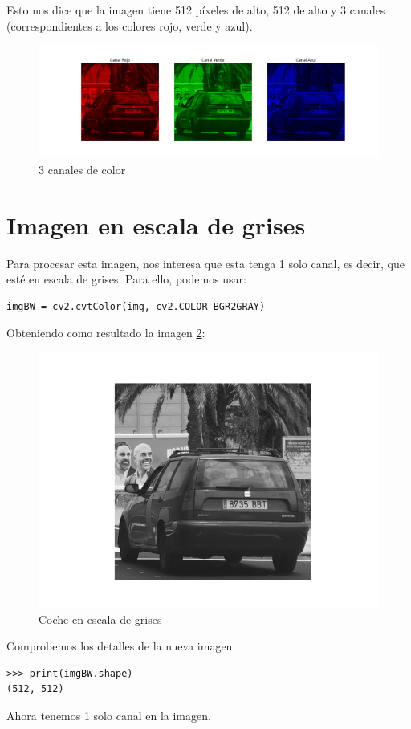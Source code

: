 Esto nos dice que la imagen tiene 512 píxeles de alto, 512 de alto y 3 canales (correspondientes a los colores rojo, verde y azul). 
\begin{figure}[H]
    \centering
    \includegraphics[width=1\linewidth]{Images/coche1Canales.png}
    \caption{3 canales de color}
    \label{coche1Canales}
\end{figure}

\section{Imagen en escala de grises}
Para procesar esta imagen, nos interesa que esta tenga 1 solo canal, es decir, que esté en escala de grises. Para ello, podemos usar:
\begin{verbatim}
imgBW = cv2.cvtColor(img, cv2.COLOR_BGR2GRAY)
\end{verbatim}
Obteniendo como resultado la imagen \ref{coche1B&W}:
\begin{figure}[H]
    \centering
    \includegraphics[width=0.6\linewidth]{Images/coche1B&W.png}
    \caption{Coche en escala de grises}
    \label{coche1B&W}
\end{figure}
Comprobemos los detalles de la nueva imagen:
\begin{verbatim}
>>> print(imgBW.shape)
(512, 512)
\end{verbatim}
Ahora tenemos 1 solo canal en la imagen.

